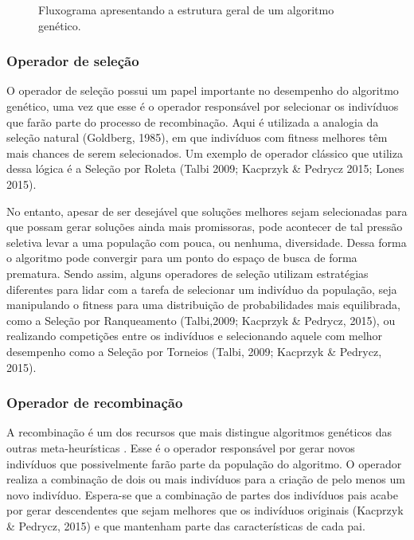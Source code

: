 \begin{figure}[htb]
\centering

\caption{Fluxograma apresentando a estrutura geral de um algoritmo genético.}

\end{figure}

\subsubsection{Operador de seleção}
O operador de seleção possui um papel importante no desempenho do algoritmo genético, uma vez que esse é o operador responsável por selecionar os indivíduos que farão parte do processo de recombinação.  Aqui é utilizada a analogia da seleção natural (Goldberg, 1985), em que indivíduos com fitness melhores têm mais chances de serem selecionados. Um exemplo de operador clássico que utiliza dessa lógica é a Seleção por Roleta (Talbi 2009; Kacprzyk \& Pedrycz 2015; Lones 2015).

No entanto, apesar de ser desejável que soluções melhores sejam selecionadas para que possam gerar soluções ainda mais promissoras, pode acontecer de tal pressão seletiva levar a uma população com pouca, ou nenhuma, diversidade. Dessa forma o algoritmo pode convergir para um ponto do espaço de busca de forma prematura. Sendo assim, alguns operadores de seleção utilizam estratégias diferentes para lidar com a tarefa de selecionar um indivíduo da população, seja manipulando o fitness para uma distribuição de probabilidades mais equilibrada, como a Seleção por Ranqueamento (Talbi,2009; Kacprzyk \& Pedrycz, 2015), ou realizando competições entre os indivíduos e selecionando aquele com melhor desempenho como a Seleção por Torneios (Talbi, 2009; Kacprzyk \& Pedrycz, 2015). 

\subsubsection{Operador de recombinação}
A recombinação é um dos recursos que mais distingue algoritmos genéticos das outras meta-heurísticas \cite{Luke2013Metaheuristics}. Esse é o operador responsável por gerar novos indivíduos que possivelmente farão parte da população do algoritmo. O operador realiza a combinação de dois ou mais indivíduos para a criação de pelo menos um novo indivíduo. Espera-se que a combinação de partes dos indivíduos pais acabe por gerar descendentes que sejam melhores que os indivíduos originais (Kacprzyk \& Pedrycz, 2015) e que mantenham parte das características de cada pai.

